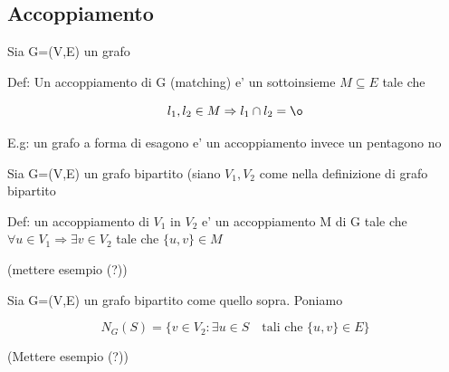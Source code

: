 \documentclass{article}
\begin{document}
        \subsection{Accoppiamento}
        \begin{flushleft}
          Sia G=(V,E) un grafo 
        \end{flushleft}
        \begin{flushleft}
          Def: Un accoppiamento di G (matching) e' un sottoinsieme $M \subseteq E$ tale che
        \end{flushleft}
        \begin{equation*}
          l_1,l_2 \in M \Rightarrow l_1 \cap l_2 = \o
        \end{equation*}
        \begin{flushleft}
          E.g: un grafo a forma di esagono e' un accoppiamento invece un pentagono no
        \end{flushleft}
        \begin{flushleft}
          Sia G=(V,E) un grafo bipartito (siano $V_1,V_2$ come nella definizione di grafo bipartito
        \end{flushleft}
        \begin{flushleft}
          Def: un accoppiamento di $V_1$ in $V_2$ e' un accoppiamento M di G tale che $\forall u\in V_1 \Rightarrow \exists v \in V_2$ tale che $\{u,v\} \in M$
        \end{flushleft}
        \begin{flushleft}
          (mettere esempio (?))
        \end{flushleft}
        \begin{flushleft}
          Sia G=(V,E) un grafo bipartito come quello sopra. Poniamo
        \end{flushleft}
        \begin{equation*}
          N_G(S)=\{v \in V_2: \exists u\in S \quad \text{tali che }\{u,v\}\in E \}
        \end{equation*}
        \begin{flushleft}
          (Mettere esempio (?))
        \end{flushleft}
\end{document}
